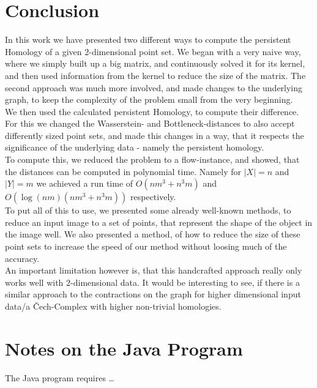 \documentclass[11pt, a4paper, UKenglish]{article}
\begin{document}
    \section*{Conclusion}
    In this work we have presented two different ways to compute the persistent Homology of a given $2$-dimensional point set.
    We began with a very na\̈ive way, where we simply built up a big matrix, and continuously solved it for its kernel, and then used information from the kernel to reduce the size of the matrix.
    The second approach was much more involved, and made changes to the underlying graph, to keep the complexity of the problem small from the very beginning.\\
    We then used the calculated persistent Homology, to compute their difference.
    For this we changed the Wasserstein- and Bottleneck-distances to also accept differently sized point sets, and made this changes in a way, that it respects the significance of the underlying data - namely the persistent homology.\\
    To compute this, we reduced the problem to a flow-instance, and showed, that the distances can be computed in polynomial time.
    Namely for $|X|=n$ and $|Y|=m$ we achieved a run time of $O(nm^3+n^3 m)$ and $O(\log(nm)(nm^3+n^3 m))$ respectively.\\
    To put all of this to use, we presented some already well-known methods, to reduce an input image to a set of points, that represent the shape of the object in the image well.
    We also presented a method, of how to reduce the size of these point sets to increase the speed of our method without loosing much of the accuracy.\\
    An important limitation however is, that this handcrafted approach really only works well with $2$-dimensional data.
    It would be interesting to see, if there is a similar approach to the contractions on the graph for higher dimensional input data/a Čech-Complex with higher non-trivial homologies.
    \newpage
    \section*{Notes on the Java Program}
    The Java program requires \ldots
\end{document}
